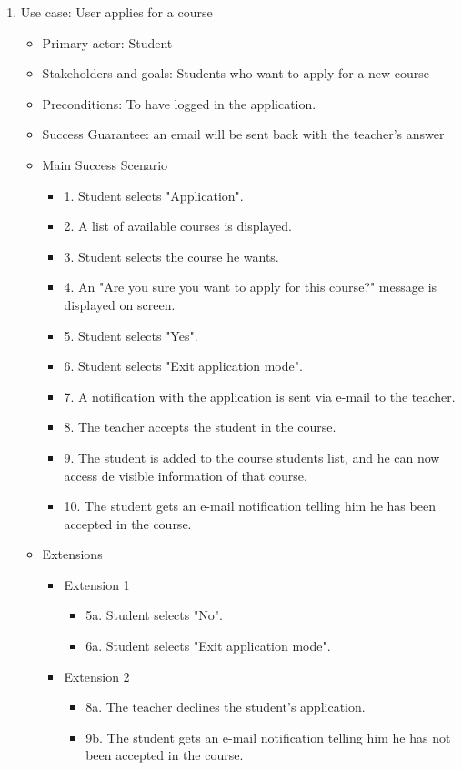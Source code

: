 \documentclass{article}
\begin{document}
\begin{enumerate}
\begin{enumerate}
\begin{enumerate}
\begin{itemize}
			\end{itemize}
		
		
		
			\item{Use case: User applies for a course}
		
			
			\begin{itemize}
				\item Primary actor: Student
				\item Stakeholders and goals: Students who want to apply for a new course
				\item Preconditions: To have logged in the application.
				\item Success Guarantee: an email will be sent back with the teacher's answer
				\item Main Success Scenario
				\begin{itemize}
					\item 1. Student selects "Application".
					\item 2. A list of available courses is displayed.
					\item 3. Student selects the course he wants.
					\item 4. An "Are you sure you want to apply for this course?" message is displayed on screen.
					\item 5. Student selects "Yes".
					\item 6. Student selects "Exit application mode".
					\item 7. A notification with the application is sent via e-mail to the teacher.
					\item 8. The teacher accepts the student in the course.
					\item 9. The student is added to the course students list, and he can now access de visible information of that course.
					\item 10. The student gets an e-mail notification telling him he has been accepted in the course.
				\end{itemize}
				\item Extensions
				\begin{itemize}
					\item Extension 1
					\begin{itemize}
						\item 5a. Student selects "No".
						\item 6a. Student selects "Exit application mode".
					\end{itemize}
					\item Extension 2
					\begin{itemize}
						\item 8a. The teacher declines the student's application.
						\item 9b. The student gets an e-mail notification telling him he has not been accepted in the course.
					\end{itemize}
					

\end{itemize}
\end{itemize}
\end{enumerate}
\end{enumerate}
\end{enumerate}
\end{document}
